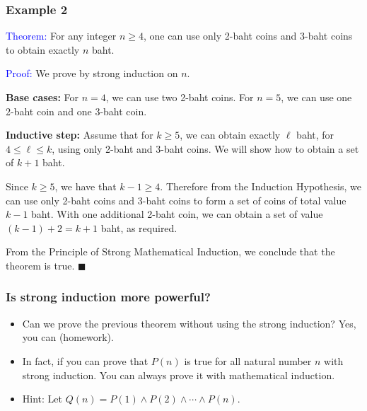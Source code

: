 \begin{frame}\frametitle{Example 2}
  \textcolor{blue}{Theorem:} For any integer $n\geq 4$, one can use only
  2-baht coins and 3-baht coins to obtain exactly $n$ baht.
  \vspace{0.1in}

  \textcolor{blue}{Proof:} We prove by strong induction on $n$.
  \pause
  
  {\bf Base cases:} For $n=4$, we can use two 2-baht coins.  For
  $n=5$, we can use one 2-baht coin and one 3-baht coin.
  \pause
  \vspace{0.125in}

  {\bf Inductive step:} Assume that for $k\geq 5$, we can obtain
  exactly $\ell$ baht, for $4\leq\ell\leq k$, using only 2-baht and
  3-baht coins.  We will show how to obtain a set of $k+1$ baht.
  \pause
  
  Since $k\geq 5$, we have that $k-1 \geq 4$.  Therefore from the
  Induction Hypothesis, we can use only 2-baht coins and 3-baht coins
  to form a set of coins of total value $k-1$ baht.  \pause With one
  additional 2-baht coin, we can obtain a set of value $(k-1) + 2 =
  k+1$ baht, as required.  \pause
  \vspace{0.125in}

  From the Principle of Strong Mathematical Induction, we conclude
  that the theorem is true. $\blacksquare$
\end{frame}

\begin{frame}\frametitle{Is strong induction more powerful?}
  \begin{itemize}
  \item Can we prove the previous theorem without using the strong
    induction?
    \pause Yes, you can (homework). \pause
  \item In fact, if you can prove that $P(n)$ is true for all natural
    number $n$ with strong induction.  You can always prove it with
    mathematical induction.
    \pause
  \item Hint: Let $Q(n)=P(1)\wedge P(2)\wedge\cdots\wedge P(n)$.
  \end{itemize}
\end{frame}
